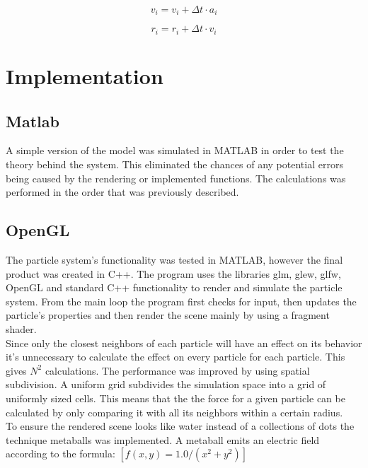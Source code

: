 \documentclass[a4paper,12pt,twoside,final]{report}
\begin{document}
\begin{enumerate}
\noindent \begin{equation}
{v_i} = {v_i + \Delta t \cdot a_i}
\label{e8}
\end{equation}

\noindent \begin{equation}
{r_i} = {r_i + \Delta t \cdot v_i}
\label{e9}
\end{equation}

\end{enumerate}


\chapter{Implementation}

\section{Matlab}
A simple version of the model was simulated in MATLAB in order to test the theory behind the system. This eliminated the chances of any potential errors being caused by the rendering or implemented functions. The calculations was performed in the order that was previously described.

\section{OpenGL}
The particle system’s functionality was tested in MATLAB, however the final product was created in C++. The program uses the libraries glm, glew, glfw, OpenGL and standard C++ functionality to render and simulate the particle system. From the main loop the program first checks for input, then updates the particle’s properties and then render the scene mainly by using a fragment shader. \\

\noindent Since only the closest neighbors of each particle will have an effect on its behavior it’s unnecessary to calculate the effect on every particle for each particle. This gives $N^2$ calculations. The performance was improved by using spatial subdivision. A uniform grid subdivides the simulation space into a grid of uniformly sized cells. This means that the the force for a given particle can be calculated by only comparing it with all its neighbors within a certain radius. \\

\noindent To ensure the rendered scene looks like water instead of a collections of dots the technique metaballs was implemented. A metaball emits an electric field according to the formula: $[f(x,y) = 1.0 / (x^2 + y^2)]$ \\
\end{document}
